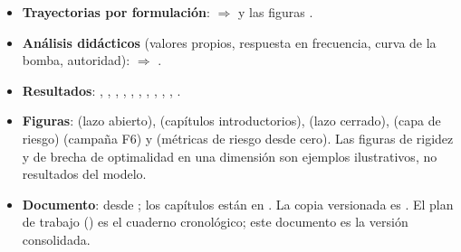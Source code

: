 \begin{itemize}
         (Knitro sobre las consultas serializadas, requiere
        licencia); resumen y figuras  $\Rightarrow$
        .
  \item \textbf{Trayectorias por formulación}: 
        $\Rightarrow$  y las figuras
        .
  \item \textbf{Análisis didácticos} (valores propios, respuesta en frecuencia, curva de la
        bomba, autoridad):  $\Rightarrow$
        .
  \item \textbf{Resultados}: , ,
        , , ,
        , , , , ,
        .
  \item \textbf{Figuras}:  (lazo abierto),
         (capítulos introductorios),
         (lazo cerrado),  (capa
        de riesgo)  (campaña F6) y 
        (métricas de riesgo desde cero). Las figuras de rigidez y de
        brecha de optimalidad en una dimensión son ejemplos ilustrativos, no resultados del
        modelo.
  \item \textbf{Documento}:  desde
        ; los capítulos están en . La copia versionada es
        . El plan de trabajo
        () es el cuaderno cronológico; este
        documento es la versión consolidada.
\end{itemize}
